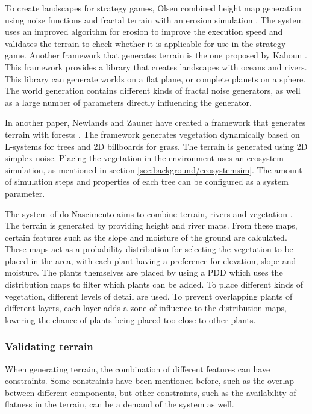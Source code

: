 To create landscapes for strategy games, Olsen combined height map generation using noise functions and fractal terrain with an erosion simulation \cite{olsen_realtime_2004}. The system uses an improved algorithm for erosion to improve the execution speed and validates the terrain to check whether it is applicable for use in the strategy game. Another framework that generates terrain is the one proposed by Kahoun \cite{kahoun_realtime_2013}. This framework provides a library that creates landscapes with oceans and rivers. This library can generate worlds on a flat plane, or complete planets on a sphere. The world generation contains different kinds of fractal noise generators, as well as a large number of parameters directly influencing the generator.

In another paper, Newlands and Zauner have created a framework that generates terrain with forests \cite{newlands_procedural_2022}. The framework generates vegetation dynamically based on L-systems for trees and 2D billboards for grass. The terrain is generated using 2D simplex noise. Placing the vegetation in the environment uses an ecosystem simulation, as mentioned in section \ref{sec:background/ecosystemsim}. The amount of simulation steps and properties of each tree can be configured as a system parameter.

The system of do Nascimento aims to combine terrain, rivers and vegetation \cite{do_nascimento_gpu-based_2018}. The terrain is generated by providing height and river maps. From these maps, certain features such as the slope and moisture of the ground are calculated. These maps act as a probability distribution for selecting the vegetation to be placed in the area, with each plant having a preference for elevation, slope and moisture. The plants themselves are placed by using a PDD which uses the distribution maps to filter which plants can be added. To place different kinds of vegetation, different levels of detail are used. To prevent overlapping plants of different layers, each layer adds a zone of influence to the distribution maps, lowering the chance of plants being placed too close to other plants.

\subsubsection{Validating terrain} 
When generating terrain, the combination of different features can have constraints. Some constraints have been mentioned before, such as the overlap between different components, but other constraints, such as the availability of flatness in the terrain, can be a demand of the system as well.

